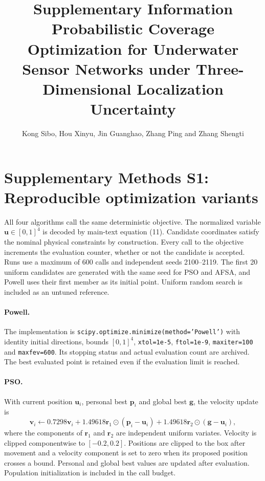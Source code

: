 \documentclass[10pt]{article}
\title{Supplementary Information\\Probabilistic Coverage Optimization for Underwater Sensor Networks under Three-Dimensional Localization Uncertainty}
\author{Kong Sibo, Hou Xinyu, Jin Guanghao, Zhang Ping and Zhang Shengti}\date{}
\begin{document}
\maketitle
\section*{Supplementary Methods S1: Reproducible optimization variants}
All four algorithms call the same deterministic objective. The normalized variable $\mathbf u\in[0,1]^4$ is decoded by main-text equation (11). Candidate coordinates satisfy the nominal physical constraints by construction. Every call to the objective increments the evaluation counter, whether or not the candidate is accepted. Runs use a maximum of 600 calls and independent seeds 2100--2119. The first 20 uniform candidates are generated with the same seed for PSO and AFSA, and Powell uses their first member as its initial point. Uniform random search is included as an untuned reference.

\paragraph{Powell.} The implementation is \texttt{scipy.optimize.minimize(method='Powell')} with identity initial directions, bounds $[0,1]^4$, \texttt{xtol=1e-5}, \texttt{ftol=1e-9}, \texttt{maxiter=100} and \texttt{maxfev=600}. Its stopping status and actual evaluation count are archived. The best evaluated point is retained even if the evaluation limit is reached.

\paragraph{PSO.} With current position $\mathbf u_i$, personal best $\mathbf p_i$ and global best $\mathbf g$, the velocity update is
\[
\mathbf v_i\leftarrow0.7298\mathbf v_i+1.49618\mathbf r_1\odot(\mathbf p_i-\mathbf u_i)+1.49618\mathbf r_2\odot(\mathbf g-\mathbf u_i),
\]
where the components of $\mathbf r_1$ and $\mathbf r_2$ are independent uniform variates. Velocity is clipped componentwise to $[-0.2,0.2]$. Positions are clipped to the box after movement and a velocity component is set to zero when its proposed position crosses a bound. Personal and global best values are updated after evaluation. Population initialization is included in the call budget.
\end{document}
